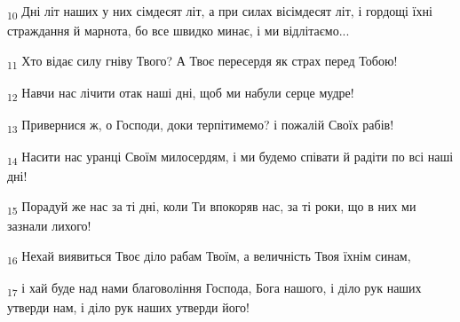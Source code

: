 \begin{tcolorbox}
\textsubscript{10} Дні літ наших у них сімдесят літ, а при силах вісімдесят літ, і гордощі їхні страждання й марнота, бо все швидко минає, і ми відлітаємо...
\end{tcolorbox}
\begin{tcolorbox}
\textsubscript{11} Хто відає силу гніву Твого? А Твоє пересердя як страх перед Тобою!
\end{tcolorbox}
\begin{tcolorbox}
\textsubscript{12} Навчи нас лічити отак наші дні, щоб ми набули серце мудре!
\end{tcolorbox}
\begin{tcolorbox}
\textsubscript{13} Привернися ж, о Господи, доки терпітимемо? і пожалій Своїх рабів!
\end{tcolorbox}
\begin{tcolorbox}
\textsubscript{14} Насити нас уранці Своїм милосердям, і ми будемо співати й радіти по всі наші дні!
\end{tcolorbox}
\begin{tcolorbox}
\textsubscript{15} Порадуй же нас за ті дні, коли Ти впокоряв нас, за ті роки, що в них ми зазнали лихого!
\end{tcolorbox}
\begin{tcolorbox}
\textsubscript{16} Нехай виявиться Твоє діло рабам Твоїм, а величність Твоя їхнім синам,
\end{tcolorbox}
\begin{tcolorbox}
\textsubscript{17} і хай буде над нами благовоління Господа, Бога нашого, і діло рук наших утверди нам, і діло рук наших утверди його!
\end{tcolorbox}
